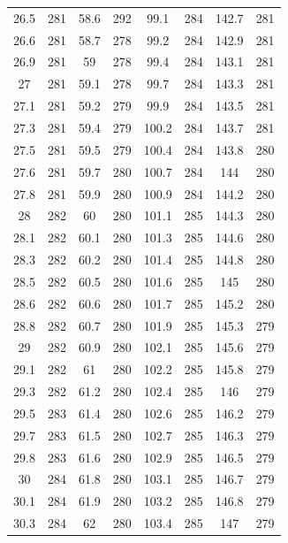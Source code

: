 \documentclass[12pt]{ctexart}
\numberwithin{equation}{section}
\begin{document}
\begin{longtable}{cc|cc|cc|cc}
26.5  &  281  &  58.6  &  292  &  99.1  &  284  &  142.7  &  281  \\
26.6  &  281  &  58.7  &  278  &  99.2  &  284  &  142.9  &  281  \\
26.9  &  281  &  59  &  278  &  99.4  &  284  &  143.1  &  281  \\
27  &  281  &  59.1  &  278  &  99.7  &  284  &  143.3  &  281  \\
27.1  &  281  &  59.2  &  279  &  99.9  &  284  &  143.5  &  281  \\
27.3  &  281  &  59.4  &  279  &  100.2  &  284  &  143.7  &  281  \\
27.5  &  281  &  59.5  &  279  &  100.4  &  284  &  143.8  &  280  \\
27.6  &  281  &  59.7  &  280  &  100.7  &  284  &  144  &  280  \\
27.8  &  281  &  59.9  &  280  &  100.9  &  284  &  144.2  &  280  \\
28  &  282  &  60  &  280  &  101.1  &  285  &  144.3  &  280  \\
28.1  &  282  &  60.1  &  280  &  101.3  &  285  &  144.6  &  280  \\
28.3  &  282  &  60.2  &  280  &  101.4  &  285  &  144.8  &  280  \\
28.5  &  282  &  60.5  &  280  &  101.6  &  285  &  145  &  280  \\
28.6  &  282  &  60.6  &  280  &  101.7  &  285  &  145.2  &  280  \\
28.8  &  282  &  60.7  &  280  &  101.9  &  285  &  145.3  &  279  \\
29  &  282  &  60.9  &  280  &  102.1  &  285  &  145.6  &  279  \\
29.1  &  282  &  61  &  280  &  102.2  &  285  &  145.8  &  279  \\
29.3  &  282  &  61.2  &  280  &  102.4  &  285  &  146  &  279  \\
29.5  &  283  &  61.4  &  280  &  102.6  &  285  &  146.2  &  279  \\
29.7  &  283  &  61.5  &  280  &  102.7  &  285  &  146.3  &  279  \\
29.8  &  283  &  61.6  &  280  &  102.9  &  285  &  146.5  &  279  \\
30  &  284  &  61.8  &  280  &  103.1  &  285  &  146.7  &  279  \\
30.1  &  284  &  61.9  &  280  &  103.2  &  285  &  146.8  &  279  \\
30.3  &  284  &  62  &  280  &  103.4  &  285  &  147  &  279  \\

\end{longtable}
\end{document}

